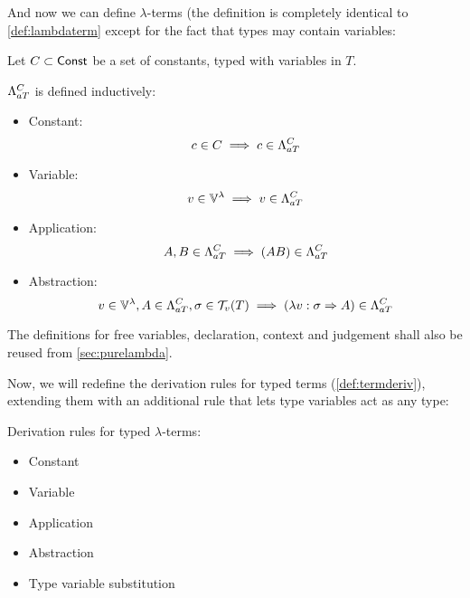 \documentclass[main.tex]{subfiles}
\begin{document}
And now we can define $\lambda$-terms (the definition is completely identical
to \cref{def:lambdaterm} except for the fact that types may contain variables:
\begin{defn}
    Let $C \subset \const$ be a set of constants, typed with variables in $T$.

    $\tvlambda{T}{C}$ is defined inductively:
    \begin{itemize}
        \item Constant:    \[ c \in C \implies c \in \tvlambda{T}{C} \]
        \item Variable:    \[ v \in \lvars \implies v \in \tvlambda{T}{C} \]
        \item Application: \[ A, B \in \tvlambda{T}{C} \implies (AB) \in \tvlambda{T}{C} \]
        \item Abstraction: \[ v \in \lvars, A \in \tvlambda{T}{C}, \sigma \in \tvclos{T}
                \implies (\lambda v : \sigma \abstr A) \in \tvlambda{T}{C} \]
    \end{itemize}
\end{defn}

The definitions for free variables, declaration, context and judgement shall
also be reused from \cref{sec:purelambda}.

Now, we will redefine the derivation rules for typed terms (\cref{def:termderiv}),
extending them with an additional rule that lets type variables act as any type:
\begin{defn}
    Derivation rules for typed $\lambda$-terms:
    \begin{itemize}
        \item Constant
        \item Variable
        \item Application
        \item Abstraction
        \item Type variable substitution
    \end{itemize}
\end{defn}
\end{document}
